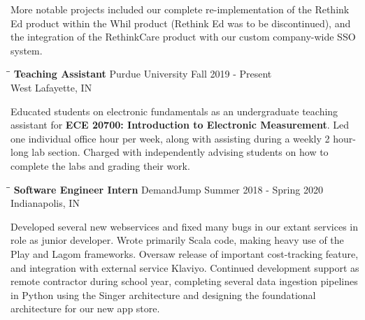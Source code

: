 \documentclass[10pt]{res}
\begin{document}
\begin{resume}
	More notable projects included our complete re-implementation of the Rethink Ed product
	within the Whil product (Rethink Ed was to be discontinued), and the integration
	of the RethinkCare product with our custom company-wide SSO system.
	\begin{tabbing}
   \hspace{2.3in}\= \hspace{2.6in}\= \kill %
    {\bf Teaching Assistant} \>Purdue University \>Fall 2019 - Present \\
                             \>West Lafayette, IN
   \end{tabbing}\vspace{-20pt}      %
	Educated students on electronic fundamentals as an undergraduate teaching assistant for \textbf{ECE 20700: Introduction to Electronic Measurement}.
	Led one individual office hour per week, along with assisting during a weekly 2 hour-long lab section.
	Charged with independently advising students on how to complete the labs and grading their work.
	\vspace{-10pt}\begin{tabbing}
   \hspace{2.3in}\= \hspace{2.6in}\= \kill %
    {\bf Software Engineer Intern} \>DemandJump \>Summer 2018 - Spring 2020 \\
                             \>Indianapolis, IN
   \end{tabbing}\vspace{-20pt}      %
  Developed several new webservices and fixed many bugs in our extant services in role as junior
  developer. Wrote primarily Scala code, making heavy use of the Play and Lagom frameworks. Oversaw release of important cost-tracking feature, and integration with external service
  Klaviyo. Continued development support as remote contractor during school year, completing several
	data ingestion pipelines in Python using the Singer architecture and designing the foundational architecture
	for our new app store.
\begin{comment} %
	\vspace{-10pt}\begin{tabbing}
   \hspace{2.3in}\= \hspace{2.6in}\= \kill %
    {\bf Team Software Lead} \>Purdue EPICS DRC - ATG \>Fall 2017 \\

\end{comment}
\end{resume}
\end{document}
